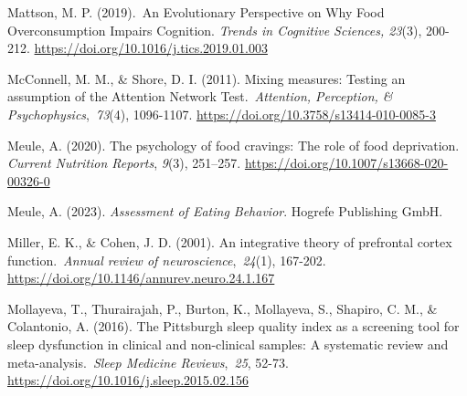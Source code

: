 \documentclass[authordate, empirical,issue]{jote-new-article}
\begin{document}
Mattson, M. P. (2019). An Evolutionary Perspective on Why Food Overconsumption Impairs Cognition.\emph{ Trends in Cognitive Sciences, 23}(3), 200-212. \url{https://doi.org/10.1016/j.tics.2019.01.003}









McConnell, M. M., \& Shore, D. I. (2011). Mixing measures: Testing an assumption of the Attention Network Test. \emph{Attention, Perception, \& Psychophysics}, \emph{73}(4), 1096-1107. \url{https://doi.org/10.3758/s13414-010-0085-3}



Meule, A. (2020). The psychology of food cravings: The role of food deprivation. \emph{Current Nutrition Reports}, \emph{9}(3), 251--257. \href{https://doi.org/10.1007/s13668-020-00326-0}{https://doi.org/10.1007/s13668-020-00326-0}



Meule, A. (2023). \emph{Assessment of Eating Behavior}. Hogrefe Publishing GmbH.



Miller, E. K., \& Cohen, J. D. (2001). An integrative theory of prefrontal cortex function. \emph{Annual review of neuroscience}, \emph{24}(1), 167-202. \url{https://doi.org/10.1146/annurev.neuro.24.1.167}






Mollayeva, T., Thurairajah, P., Burton, K., Mollayeva, S., Shapiro, C. M., \& Colantonio, A. (2016). The Pittsburgh sleep quality index as a screening tool for sleep dysfunction in clinical and non-clinical samples: A systematic review and meta-analysis. \emph{Sleep Medicine Reviews}, \emph{25}, 52-73. \url{https://doi.org/10.1016/j.sleep.2015.02.156}
\end{document}
